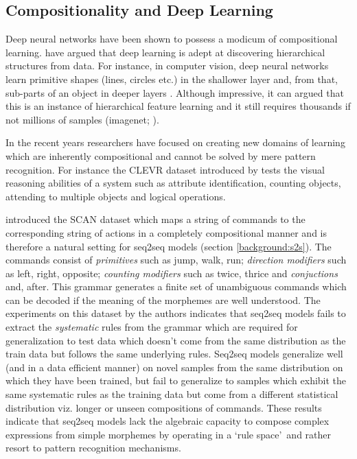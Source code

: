 
\subsection{Compositionality and Deep Learning}
Deep neural networks have been shown to possess a modicum of compositional learning. \cite{LeCun2015} have argued that deep learning is adept at discovering hierarchical structures from data. For instance, in computer vision, deep neural networks learn primitive shapes (lines, circles etc.) in the shallower layer and, from that, sub-parts of an object in deeper layers \citep{Zeiler2014}. Although impressive, it can argued that this is an instance of hierarchical feature learning and it still requires thousands if not millions of samples (imagenet; \citep{Deng2009}).

In the recent years researchers have focused on creating new domains of learning which are inherently compositional and cannot be solved by mere pattern recognition. For instance the CLEVR dataset introduced by \cite{Johnson2017} tests the visual reasoning abilities of a system such as attribute identification, counting objects, attending to multiple objects and logical operations. 


\cite{Lake2017} introduced the SCAN dataset which maps a string of commands to the corresponding string of actions in a completely compositional manner and is therefore a natural setting for seq2seq models (section \ref{background:s2s}). The commands consist of \textit{primitives} such as jump, walk, run; \textit{direction modifiers} such as left, right, opposite; \textit{counting modifiers} such as twice, thrice and \textit{conjuctions} and, after. This grammar generates a finite set of unambiguous commands which can be decoded if the meaning of the morphemes are well understood. The experiments on this dataset by the authors indicates that seq2seq models fails to extract the \textit{systematic} rules from the grammar which are required for generalization to test data which doesn't come from the same distribution as the train data but follows the same underlying rules. Seq2seq models generalize well (and in a data efficient manner) on novel samples from the same distribution on which they have been trained, but fail to generalize to samples which exhibit the same systematic rules as the training data but come from a different statistical distribution viz. longer or unseen compositions of commands. These results indicate that seq2seq models lack the algebraic capacity to compose complex expressions from simple morphemes by operating in a \lq rule space{}\rq\ and rather resort to pattern recognition mechanisms.

